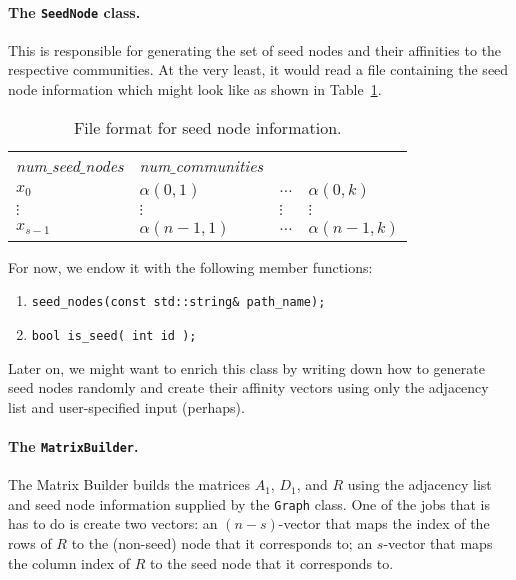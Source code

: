 \documentclass[12pt]{article}
\begin{document}
\paragraph{The \texttt{SeedNode} class.} This is responsible 
for generating the set of seed nodes and their affinities 
to the respective communities. At the very least, it would read 
a file containing the seed node information which might look like 
as shown in Table~\ref{tab:seed_node}. 

\begin{table}[ht]
\centering
\begin{tabular}{llll}
\emph{num$\_$seed$\_$nodes} & \emph{num$\_$communities} &  & \\
$x_0$               & $\alpha(0, 1)$ & $\ldots$ & $\alpha(0, k)$ \\
$\vdots$ & $\vdots$ & $\vdots$ & $\vdots$ \\
$x_{s-1}$  & $\alpha(n-1, 1)$ & $\ldots$ & $\alpha(n-1, k)$ 
\end{tabular}
\caption{File format for seed node information.} \label{tab:seed_node}
\end{table}

For now, we endow it with the following member functions:
\begin{enumerate}
	\item \verb|seed_nodes(const std::string& path_name);|
	\item \verb|bool is_seed( int id );|
\end{enumerate}
Later on, we might want to enrich this class by writing down how 
to generate seed nodes randomly and create their affinity vectors
using only the adjacency list and user-specified input (perhaps). 
	 
\paragraph{The \texttt{MatrixBuilder}.} The Matrix Builder builds the 
matrices $A_1$, $D_1$, and $R$ using the adjacency list and seed node 
information supplied by the \verb|Graph| class. One of the jobs that 
is has to do is create two vectors: an $(n - s)$-vector that maps 
the index of the rows of $R$ to the (non-seed) node that it corresponds to;
an $s$-vector that maps the column index of $R$ to the seed node that 
it corresponds to.   
\end{document}
